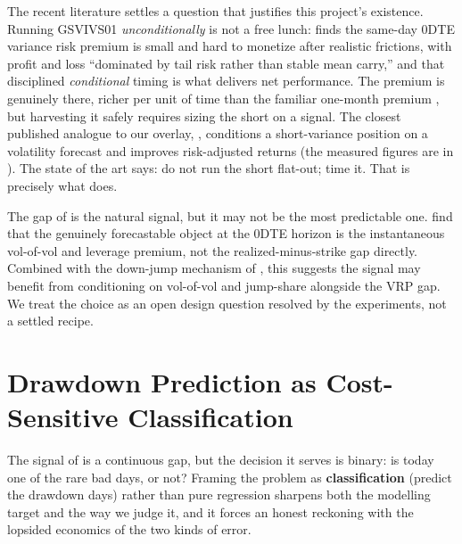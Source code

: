 \begin{application}
The recent literature settles a question that justifies this project's existence. Running GSVIVS01 \emph{unconditionally} is not a free lunch: \citet{Vilkov2024} finds the same-day 0DTE variance risk premium is small and hard to monetize after realistic frictions, with profit and loss ``dominated by tail risk rather than stable mean carry,'' and that disciplined \emph{conditional} timing is what delivers net performance. The premium is genuinely there, richer per unit of time than the familiar one-month premium \citep{AlmeidaFreireHizmeri2024}, but harvesting it safely requires sizing the short on a signal. The closest published analogue to our overlay, \citet{Yang2024}, conditions a short-variance position on a volatility forecast and improves risk-adjusted returns (the measured figures are in ). The state of the art says: do not run the short flat-out; time it. That is precisely what  does.
\end{application}

\begin{warning}
The gap of  is the natural signal, but it may not be the most predictable one. \citet{BandiFusariReno2024} find that the genuinely forecastable object at the 0DTE horizon is the instantaneous vol-of-vol and leverage premium, not the realized-minus-strike gap directly. Combined with the down-jump mechanism of , this suggests the signal may benefit from conditioning on vol-of-vol and jump-share alongside the VRP gap. We treat the choice as an open design question resolved by the experiments, not a settled recipe.
\end{warning}

\section{Drawdown Prediction as Cost-Sensitive Classification}
\label{sec:gsvivs:classification}

The signal of  is a continuous gap, but the decision it serves is binary: is today one of the rare bad days, or not? Framing the problem as \textbf{classification} (predict the drawdown days) rather than pure regression sharpens both the modelling target and the way we judge it, and it forces an honest reckoning with the lopsided economics of the two kinds of error.

